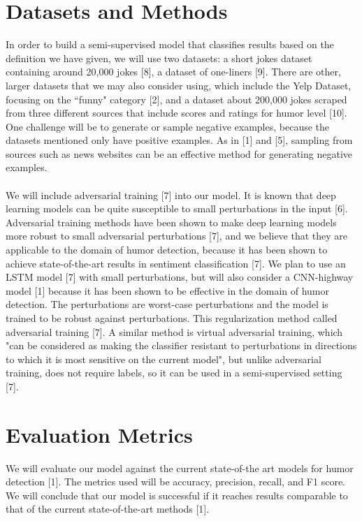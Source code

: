 \documentclass{article}
\begin{document}
\section{Datasets and Methods}
         In order to build a semi-supervised model that classifies results based on the definition we have given, we will use two datasets: 
          a short jokes dataset containing around 20,000 jokes [8], a dataset of one-liners [9]. There are other, larger datasets that we may also consider using, which include the Yelp Dataset, focusing on the ``funny" category [2], and a dataset about 200,000 jokes scraped from three different sources that include scores and ratings for humor level [10]. One challenge will be to generate or sample negative examples, because the datasets mentioned only have positive examples. As in [1] and [5], sampling from sources such as news websites can be an effective method for generating negative examples.
        \\\\
        We will include adversarial training [7] into our model. It is known that deep learning models can be quite susceptible to small perturbations in the input [6]. Adversarial training methods have been shown to make deep learning models more robust to small adversarial perturbations [7], and we believe that they are applicable to the domain of humor detection, because it has been shown to achieve state-of-the-art results in sentiment classification [7]. We plan to use an LSTM model [7] with small perturbations, but will also consider a CNN-highway model [1] because it has been shown to be effective in the domain of humor detection. The perturbations are worst-case perturbations and the model is trained to be robust against perturbations. This regularization method called adversarial training [7]. A similar method is virtual adversarial training, which "can be considered as making the classifier resistant to perturbations in directions to which it is most sensitive on the current model", but unlike adversarial training, does not require labels, so it can be used in a semi-supervised setting [7].

\section{Evaluation Metrics}
We will evaluate our model against the current state-of-the art models for humor detection [1]. The metrics used will be accuracy, precision, recall, and F1 score. We will conclude that our model is successful if it reaches results comparable to that of the current state-of-the-art methods [1].
\pagebreak
\end{document}
